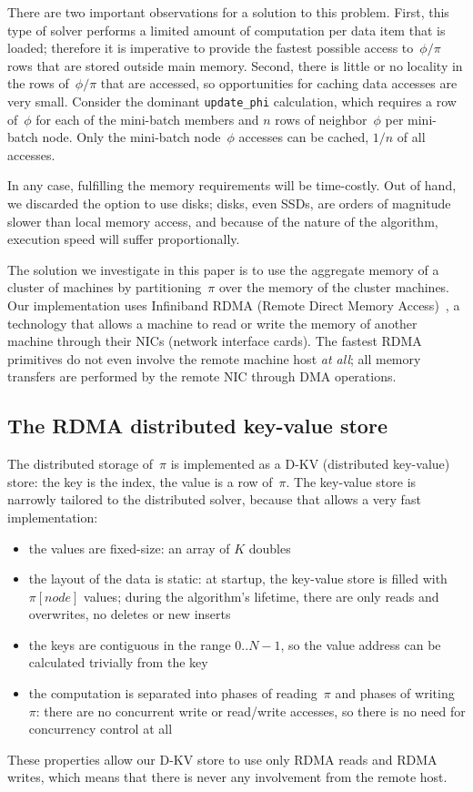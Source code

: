 There are two important observations for a solution to this problem. First,
this type of solver performs a limited amount of computation per data item
that is loaded; therefore it is imperative to provide the fastest possible
access to~$\phi/\pi$ rows that are stored outside main memory. Second,
there is little or no locality in the rows of~$\phi/\pi$ that are accessed,
so opportunities for caching data accesses are very small. Consider the
dominant \texttt{update\_phi} calculation, which requires a row of~$\phi$
for each of the mini-batch members and $n$ rows of neighbor~$\phi$ per
mini-batch node. Only the mini-batch node~$\phi$ accesses can be cached, $1/n$
of all accesses.

In any case, fulfilling the memory requirements will be time-costly. Out
of hand, we discarded the option to use disks; disks, even SSDs, are
orders of magnitude slower than local memory access, and because of the
nature of the algorithm, execution speed will suffer proportionally.

The solution we investigate in this paper is to use the aggregate
memory of a cluster of machines by partitioning~$\pi$ over the memory of
the cluster machines. Our implementation uses Infiniband RDMA (Remote
Direct Memory Access)~\cite{RDMA}, a technology that allows a machine to
read or write the memory of another machine through their NICs (network
interface cards). The fastest RDMA primitives do not even involve the
remote machine host {\em at all}; all memory transfers are performed by
the remote NIC through DMA operations.

\subsection{The RDMA distributed key-value store}

The distributed storage of~$\pi$ is implemented as a D-KV (distributed
key-value) store: the key is the index, the value is a row of~$\pi$. The
key-value store is narrowly tailored to the distributed solver, because
that allows a very fast implementation:
\begin{itemize}
\item the values are fixed-size: an array of $K$ doubles
\item the layout of the data is static: at startup, the key-value store is
filled with~$\pi[node]$ values; during the algorithm's lifetime, there are
only reads and overwrites, no deletes or new inserts
\item the keys are contiguous in the range $0..N-1$, so the value address
can be calculated trivially from the key
\item the computation is separated into phases of reading~$\pi$ and phases
of writing~$\pi$: there are no concurrent write or read/write accesses, so
there is no need for concurrency control at all
\end{itemize}
These properties allow our D-KV store to use only RDMA reads and RDMA writes,
which means that there is never any involvement from the remote host.

